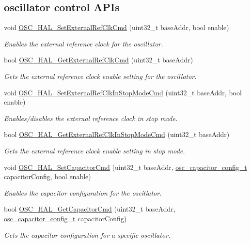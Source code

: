 \subsection*{oscillator control A\+P\+Is}
\begin{DoxyCompactItemize}
\item 
void \hyperlink{group__osc__hal_ga1b1f3852fc78a98eb8dfd2fbdead4f6b}{O\+S\+C\+\_\+\+H\+A\+L\+\_\+\+Set\+External\+Ref\+Clk\+Cmd} (uint32\+\_\+t base\+Addr, bool enable)
\begin{DoxyCompactList}\small\item\em Enables the external reference clock for the oscillator. \end{DoxyCompactList}\item 
bool \hyperlink{group__osc__hal_gaa5ce7b966f53ec89b3b38d8983e17ef1}{O\+S\+C\+\_\+\+H\+A\+L\+\_\+\+Get\+External\+Ref\+Clk\+Cmd} (uint32\+\_\+t base\+Addr)
\begin{DoxyCompactList}\small\item\em Gets the external reference clock enable setting for the oscillator. \end{DoxyCompactList}\item 
void \hyperlink{group__osc__hal_ga868cd4379e5ae1d71fd6bd22a39a49eb}{O\+S\+C\+\_\+\+H\+A\+L\+\_\+\+Set\+External\+Ref\+Clk\+In\+Stop\+Mode\+Cmd} (uint32\+\_\+t base\+Addr, bool enable)
\begin{DoxyCompactList}\small\item\em Enables/disables the external reference clock in stop mode. \end{DoxyCompactList}\item 
bool \hyperlink{group__osc__hal_ga265bd11586ea4742b87afb66054f6171}{O\+S\+C\+\_\+\+H\+A\+L\+\_\+\+Get\+External\+Ref\+Clk\+In\+Stop\+Mode\+Cmd} (uint32\+\_\+t base\+Addr)
\begin{DoxyCompactList}\small\item\em Gets the external reference clock enable setting in stop mode. \end{DoxyCompactList}\item 
void \hyperlink{group__osc__hal_gaf540fc9021fd42e537b69c49720e7cc7}{O\+S\+C\+\_\+\+H\+A\+L\+\_\+\+Set\+Capacitor\+Cmd} (uint32\+\_\+t base\+Addr, \hyperlink{group__osc__hal_ga1a1be2de080a498590bda0c9504f26f8}{osc\+\_\+capacitor\+\_\+config\+\_\+t} capacitor\+Config, bool enable)
\begin{DoxyCompactList}\small\item\em Enables the capacitor configuration for the oscillator. \end{DoxyCompactList}\item 
bool \hyperlink{group__osc__hal_gad12001cf61f5f4df53c860bfdc66488e}{O\+S\+C\+\_\+\+H\+A\+L\+\_\+\+Get\+Capacitor\+Cmd} (uint32\+\_\+t base\+Addr, \hyperlink{group__osc__hal_ga1a1be2de080a498590bda0c9504f26f8}{osc\+\_\+capacitor\+\_\+config\+\_\+t} capacitor\+Config)
\begin{DoxyCompactList}\small\item\em Gets the capacitor configuration for a specific oscillator. \end{DoxyCompactList}\end{DoxyCompactItemize}


